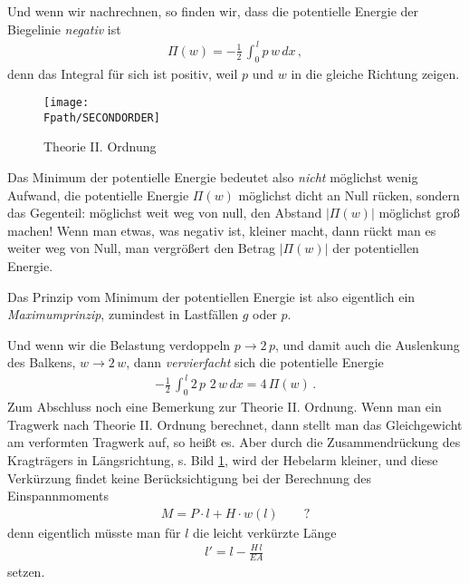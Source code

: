 {Und wenn wir nachrechnen, so finden wir, dass die potentielle Energie der Biegelinie {\em  negativ\/} ist
\begin{align}
\Pi(w) = -\frac{1}{2}\, \int_0^{\,l} p\,w\,dx\,,
\end{align}
denn das Integral f\"{u}r sich ist positiv, weil $p$ und $w$ in die gleiche Richtung zeigen.
\begin{figure}[tbp]
\centering
\if {} \sidecaption \fi
\texttt{[image: \\Fpath/SECONDORDER]}
\caption{Theorie II. Ordnung}
\label{SecondOrder}%
\end{figure}%

Das Minimum der potentielle Energie bedeutet also {\em nicht\/} m\"{o}glichst wenig Aufwand, die potentielle Energie $\Pi(w)$ m\"{o}glichst  dicht an Null r\"{u}cken, sondern das Gegenteil: m\"{o}glichst weit weg von null, den Abstand $|\Pi(w)|$ m\"{o}glichst gro{\ss} machen! Wenn man etwas, was negativ ist, kleiner macht, dann r\"{u}ckt man es weiter weg von Null, man vergr\"{o}{\ss}ert den Betrag $|\Pi(w)|$ der potentiellen Energie.

Das Prinzip vom Minimum der potentiellen Energie ist also eigentlich ein {\em Maximumprinzip\/}, zumindest in Lastf\"{a}llen $g$ oder $p$.

Und wenn wir die Belastung verdoppeln $p \to 2\,p$, und damit auch die Auslenkung des Balkens, $w \to 2\,w$, dann {\em vervierfacht\/} sich die potentielle Energie
\begin{align}
 - \frac{1}{2}\,\int_0^{\,l} 2\,  p\,\,2 \,w\,dx = 4\,\Pi(w)\,.
\end{align}
Zum Abschluss noch eine Bemerkung zur Theorie II. Ordnung.
Wenn man ein Tragwerk nach Theorie II. Ordnung berechnet, dann stellt man das Gleichgewicht am verformten Tragwerk auf, so hei{\ss}t es. Aber durch die Zusammendr\"{u}ckung des Kragtr\"{a}gers in L\"{a}ngsrichtung, s. Bild \ref{SecondOrder}, wird der Hebelarm kleiner, und diese Verk\"{u}rzung findet keine Ber\"{u}cksichtigung bei der Berechnung des Einspannmoments
\begin{align}
M = P \cdot l  + H \cdot w(l) \qquad \text{?}
\end{align}
denn eigentlich m\"{u}sste man f\"{u}r $l$ die leicht verk\"{u}rzte L\"{a}nge
\begin{align}
l' = l - \frac{H\,l}{EA}\,
\end{align}
setzen.

}
